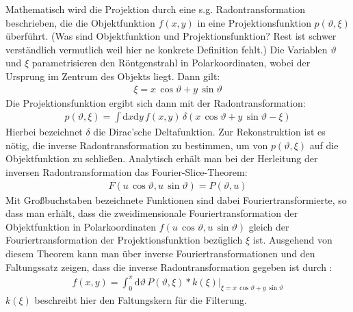 \documentclass[11pt, a4paper]{article}
\numberwithin{equation}{section}
\newcommand{\korr}[1]{{\color{red}(#1)}}
\begin{document}
Mathematisch wird die Projektion durch eine s.g. Radontransformation beschrieben, die die Objektfunktion $f(x, y)$ in eine Projektionsfunktion $p(\vartheta, \xi)$ überführt. \korr{Was sind Objektfunktion und Projektionsfunktion? Rest ist schwer verständlich vermutlich weil hier ne konkrete Definition fehlt.}
Die Variablen $\vartheta$ und $\xi$ parametrisieren den Röntgenstrahl in Polarkoordinaten, wobei der Ursprung im Zentrum des Objekts liegt.
Dann gilt:
\begin{align}
\xi=x\,\cos\vartheta + y\,\sin\vartheta
\end{align}
Die Projektionsfunktion ergibt sich dann mit der Radontransformation:
\begin{align}
p(\vartheta, \xi)=\int\mathrm{d}x\mathrm{d}y\,f(x, y)\,\delta(x\,\cos\vartheta + y\,\sin\vartheta - \xi)
\end{align}
Hierbei bezeichnet $\delta$ die Dirac'sche Deltafunktion.
Zur Rekonstruktion ist es nötig, die inverse Radontransformation zu bestimmen, um von $p(\vartheta, \xi)$ auf die Objektfunktion zu schließen.
Analytisch erhält man bei der Herleitung der inversen Radontransformation das Fourier-Slice-Theorem:
\begin{align}
F(u\,\cos\vartheta, u\,\sin\vartheta)=P(\vartheta, u)
\end{align}
Mit Großbuchstaben bezeichnete Funktionen sind dabei Fouriertransformierte, so dass man erhält, dass die zweidimensionale Fouriertransformation der Objektfunktion in Polarkoordinaten $f(u\,\cos\vartheta, u\,\sin\vartheta)$ gleich der Fouriertransformation der Projektionsfunktion bezüglich $\xi$ ist.
Ausgehend von diesem Theorem kann man über inverse Fouriertransformationen und den Faltungssatz zeigen, dass die inverse Radontransformation gegeben ist durch \cite{kalender}:
\begin{align}
f(x,y)=\int_{0}^{\pi}\left.\mathrm{d}\vartheta\,P(\vartheta, \xi)*k(\xi)\right|_{\xi=x\,\cos\vartheta + y\,\sin\vartheta}
\end{align}
$k(\xi)$ beschreibt hier den Faltungskern für die Filterung.
\end{document}
